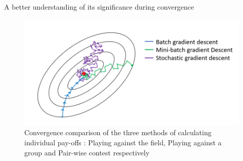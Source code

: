 \documentclass{IFES-beamer}
\begin{document}
        \begin{frame}{A better understanding of its significance during convergence}
            \begin{figure}[H]
                \centering
                \includegraphics[scale=0.25]{Images/GD.png}
                \caption{Convergence comparison of the three methods of calculating individual pay-offs : Playing against the field, Playing against a group and Pair-wise contest respectively}
                \label{fig:GD}
            \end{figure}
        \end{frame}
        
\end{document}

